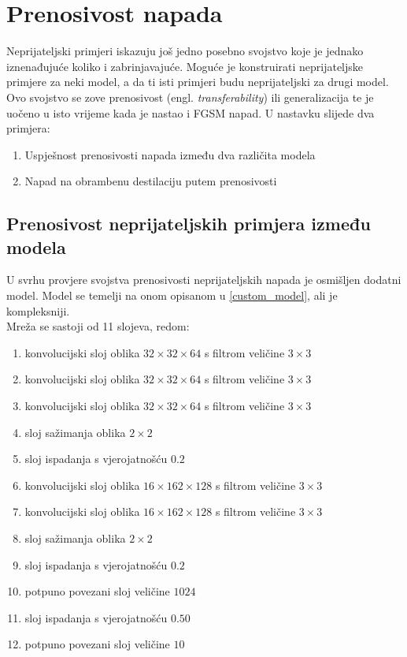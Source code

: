 \documentclass[utf8, diplomski]{fer}
\begin{document}
\section{Prenosivost napada}\label{transferability}
Neprijateljski primjeri iskazuju još jedno posebno svojstvo koje je jednako iznenađujuće koliko i zabrinjavajuće. Moguće je konstruirati neprijateljske primjere za neki model, a da ti isti primjeri budu neprijateljski za drugi model. Ovo svojstvo se zove prenosivost (engl. \textit{transferability}) ili generalizacija te je uočeno u isto vrijeme kada je nastao i FGSM napad\citep{Goodfellow2015ExplainingAH}. U nastavku slijede dva primjera: 
\begin{enumerate}[noitemsep, label=\textbullet]
\item Uspješnost prenosivosti napada između dva različita modela
\item Napad na obrambenu destilaciju putem prenosivosti
\end{enumerate}
\subsection{Prenosivost neprijateljskih primjera između modela}\label{model_transferability}
U svrhu provjere svojstva prenosivosti neprijateljskih napada je osmišljen dodatni model. Model se temelji na onom opisanom u \ref{custom_model}, ali je kompleksniji. \\
Mreža se sastoji od 11 slojeva, redom:
\begin{enumerate}[noitemsep, label=\textbullet]
  \item konvolucijski sloj oblika $32\times32\times64$ s filtrom veličine $3\times3$
  \item konvolucijski sloj oblika $32\times32\times64$ s filtrom veličine $3\times3$
  \item konvolucijski sloj oblika $32\times32\times64$ s filtrom veličine $3\times3$
  \item sloj sažimanja oblika $2\times2$
  \item sloj ispadanja s vjerojatnošću $0.2$
  \item konvolucijski sloj oblika $16\times162\times128$ s filtrom veličine $3\times3$
  \item konvolucijski sloj oblika $16\times162\times128$ s filtrom veličine $3\times3$
  \item sloj sažimanja oblika $2\times2$
  \item sloj ispadanja s vjerojatnošću $0.2$
  \item potpuno povezani sloj veličine $1024$
  \item sloj ispadanja s vjerojatnošću $0.50$
  \item potpuno povezani sloj veličine $10$
\end{enumerate}
\end{document}
